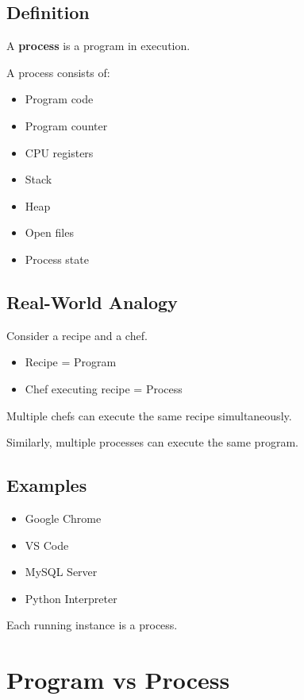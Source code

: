 \subsection{Definition}

A \textbf{process} is a program in execution.

A process consists of:

\begin{itemize}
\item Program code
\item Program counter
\item CPU registers
\item Stack
\item Heap
\item Open files
\item Process state
\end{itemize}

\subsection{Real-World Analogy}

Consider a recipe and a chef.

\begin{itemize}
\item Recipe = Program
\item Chef executing recipe = Process
\end{itemize}

Multiple chefs can execute the same recipe simultaneously.

Similarly, multiple processes can execute the same program.

\subsection{Examples}

\begin{itemize}
\item Google Chrome
\item VS Code
\item MySQL Server
\item Python Interpreter
\end{itemize}

Each running instance is a process.

\section{Program vs Process}

